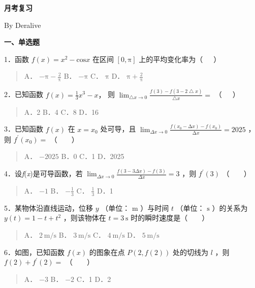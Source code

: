 \textbf{月考复习}

By Deralive

\textbf{一、单选题}

1．函数 $f(x) = x^{2} - \text{cos}x$ 在区间 $\left\lbrack 0,\text{π} \right\rbrack$ 上的平均变化率为（~~~）

\begin{quote}
    A． $- \text{π} - \frac{2}{\text{π}}$  B． $- \text{π}$  C． $\text{π}$
    D． $\text{π} + \frac{2}{\text{π}}$
\end{quote}

2．已知函数  $f(x) = \frac{1}{3}x^{3} - x，$ 则
$\lim_{\bigtriangleup x \rightarrow 0}\frac{f(3) - f(3 - 2 \bigtriangleup x)}{\bigtriangleup x} =$ （~~~）

\begin{quote}
    A．2 B．4 C．8 D．16
\end{quote}

3．已知函数 $f(x)$ 在 $x = x_{0}$ 处可导，且 $\lim_{\Delta x \rightarrow 0}\frac{f\left( x_{0} - \text{Δ}x \right) - f\left( x_{0} \right)}{\text{Δ}x} = 2025$ ，则 $f^{\prime}\left( x_{0} \right) =$ （~~~~）

\begin{quote}
    A． $- 2025$  B．0 C．1 D．2025
\end{quote}

4．设\emph{f}(\emph{x})是可导函数，若 $\lim_{\Delta x \rightarrow 0}\frac{f(3 - 3\Delta x) - f(3)}{\Delta x} = 3$ ，则 $f^{\prime}(3)$ （~~~~）

\begin{quote}
    A． $- 1$  B． $- \frac{1}{3}$  C． $\frac{1}{3}$  D．1
\end{quote}

5．某物体沿直线运动，位移 $y$ （单位： $\text{m}$ ）与时间 $t$ （单位： $\text{s}$ ）的关系为 $y(t) = 1 - t + t^{2}$ ，则该物体在 $t = 3\text{ }\text{s}$ 时的瞬时速度是（~~~~）

\begin{quote}
    A． $2\text{ }\text{m}/\text{s}$  B． $3\text{ }\text{m}/\text{s}$
    C． $4\text{ }\text{m}/\text{s}$  D． $5\text{ }\text{m}/\text{s}$
\end{quote}

6．如图，已知函数 $f(x)$ 的图象在点 $P\left( 2,f(2) \right)$ 处的切线为 $l$ ，则 $f(2) + f^{\prime}(2) =$ （~~~~）

\begin{quote}
    A． $- 3$  B． $- 2$  C．1 D．2
\end{quote}

